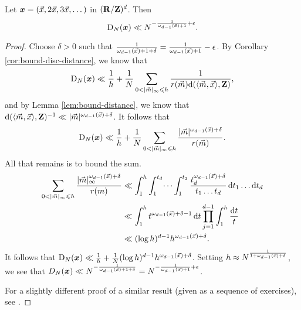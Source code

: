 \begin{theorem}
Let ${\boldsymbol x}=(\vec{x},2\vec{x},3\vec{x},\dots)$ in $(\mathbf{R}/\mathbf{Z})^d$. Then 
\[
	\operatorname{D}_N({\boldsymbol x}) \ll N^{-\frac{1}{\omega_{d-1}(\vec{x})+1}+\epsilon} .
\]
\end{theorem}
\begin{proof}
Choose $\delta>0$ such that 
$\frac{1}{\omega_{d-1}(\vec{x})+1+\delta} = \frac{1}{\omega_{d-1}(\vec{x})+1} - \epsilon$. 
By Corollary \ref{cor:bound-disc-distance}, we know that 
\[
	\D_N(\bx) \ll \frac 1 h + \frac 1 N \sum_{0<|\vm|_\infty \leqslant h} \frac{1}{r(\vm) \dd(\langle \vm,\vx\rangle,\bZ)} ,
\]
and by Lemma \ref{lem:bound-distance}, we know that 
$\mathrm{d}(\langle \vec{m},\vec{x}\rangle,\mathbf{Z})^{-1} \ll |\vec{m}|^{\omega_{d-1}(\vec{x})+\delta}$. 
It follows that 
\[
	\operatorname{D}_N({\boldsymbol x}) \ll \frac 1 h + \frac 1 N \sum_{0 < |\vec{m}|_\infty \leqslant h} \frac{|\vec{m}|^{\omega_{d-1}(\vec{x})+\delta}}{r(\vec{m})} .
\]
All that remains is to bound the sum. 
\begin{align*}
	\sum_{0< |\vec{m}|_\infty \leqslant h} \frac{|\vec{m}|_\infty^{\omega_{d-1}(\vec{x})+\delta}}{r(m)} 
		&\ll \int_1^h \int_1^{t_d} \dots \int_1^{t_2} \frac{t_d^{\omega_{d-1}(\vec{x})+\delta}}{t_1 \dots t_d}\, \mathrm{d} t_1 \dots \mathrm{d} t_d \\
		&\ll \int_1^h t^{\omega_{d-1}(\vec{x})+\delta-1}\, \mathrm{d} t \prod_{j=1}^{d-1} \int_1^h \frac{\mathrm{d} t}{t} \\
		&\ll (\log h)^{d-1} h^{\omega_{d-1}(\vec{x})+\delta} .
\end{align*}
It follows that 
$\operatorname{D}_N({\boldsymbol x}) \ll \frac 1 h + \frac 1 N (\log h)^{d-1} h^{\omega_{d-1}(\vec{x})+\delta}$. 
Setting $h\approx N^{\frac{1}{1+\omega_{d-1}(\vec{x})+\delta}}$, we see that 
$D_N({\boldsymbol x}) \ll N^{-\frac{1}{\omega_{d-1}(\vec{x})+1+\delta}} = N^{-\frac{1}{\omega_{d-1}(\vec{x})+1} + \epsilon}$. 

For a slightly different proof of a similar result (given as a sequence of 
exercises), see  \cite[Ch.~2, Ex.~3.15, 16, 17]{kuipers-niederreiter-1974}. 
\end{proof}

